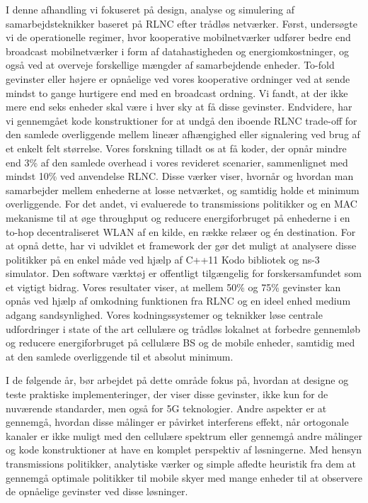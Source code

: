 I denne afhandling vi fokuseret på design, analyse og simulering af samarbejdsteknikker baseret på \ac{RLNC} efter trådløs netværker. Først, undersøgte vi de operationelle regimer, hvor kooperative mobilnetværker udfører bedre end broadcast mobilnetværker i form af datahastigheden og energiomkostninger, og også ved at overveje forskellige mængder af samarbejdende enheder. To-fold gevinster eller højere er opnåelige ved vores kooperative ordninger ved at sende mindst to gange hurtigere end med en broadcast ordning. Vi fandt, at der ikke mere end seks enheder skal være i hver sky at få disse gevinster. Endvidere, har vi gennemgået kode konstruktioner for at undgå den iboende \ac{RLNC} trade-off for den samlede overliggende mellem lineær afhængighed eller signalering ved brug af et enkelt felt størrelse. Vores forskning tilladt os at få koder, der opnår mindre end 3\% af den samlede overhead i vores revideret scenarier, sammenlignet med mindst 10\% ved anvendelse \ac{RLNC}. Disse værker viser, hvornår og hvordan man samarbejder mellem enhederne at losse netværket, og samtidig holde et minimum overliggende. For det andet, vi evaluerede to transmissions politikker og en \ac{MAC} mekanisme til at øge throughput og reducere energiforbruget på enhederne i en to-hop decentraliseret \ac{WLAN} af en kilde, en række relæer og én destination. For at opnå dette, har vi udviklet et framework der gør det muligt at analysere disse politikker på en enkel måde ved hjælp af C++11 Kodo bibliotek og ns-3 simulator. Den software værktøj er offentligt tilgængelig for forskersamfundet som et vigtigt bidrag. Vores resultater viser, at mellem 50\% og 75\% gevinster kan opnås ved hjælp af omkodning funktionen fra \ac{RLNC} og en ideel enhed medium adgang sandsynlighed. Vores kodningssystemer og teknikker løse centrale udfordringer i state of the art cellulære og trådløs lokalnet at forbedre gennemløb og reducere energiforbruget på cellulære \ac{BS} og de mobile enheder, samtidig med at den samlede overliggende til et absolut minimum.

I de følgende år, bør arbejdet på dette område fokus på, hvordan at designe og teste praktiske implementeringer, der viser disse gevinster, ikke kun for de nuværende standarder, men også for 5G teknologier. Andre aspekter er at gennemgå, hvordan disse målinger er påvirket interferens effekt, når ortogonale kanaler er ikke muligt med den cellulære spektrum eller gennemgå andre målinger og kode konstruktioner at have en komplet perspektiv af løsningerne. Med hensyn transmissions politikker, analytiske værker og simple afledte heuristik fra dem at gennemgå optimale politikker til mobile skyer med mange enheder til at observere de opnåelige gevinster ved disse løsninger.
